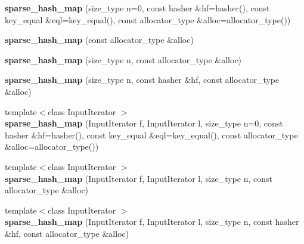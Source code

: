 \begin{DoxyCompactItemize}
\item 
{\bfseries sparse\+\_\+hash\+\_\+map} (size\+\_\+type n=0, const hasher \&hf=hasher(), const key\+\_\+equal \&eql=key\+\_\+equal(), const allocator\+\_\+type \&alloc=allocator\+\_\+type())\hypertarget{classspp___1_1sparse__hash__map_ae40db9ec7b6f4db0296504b523671af5}{}\label{classspp___1_1sparse__hash__map_ae40db9ec7b6f4db0296504b523671af5}

\item 
{\bfseries sparse\+\_\+hash\+\_\+map} (const allocator\+\_\+type \&alloc)\hypertarget{classspp___1_1sparse__hash__map_ac2a616ec8ea177f6c9a4e2570342671d}{}\label{classspp___1_1sparse__hash__map_ac2a616ec8ea177f6c9a4e2570342671d}

\item 
{\bfseries sparse\+\_\+hash\+\_\+map} (size\+\_\+type n, const allocator\+\_\+type \&alloc)\hypertarget{classspp___1_1sparse__hash__map_a2f3b25da203bb0e73ac4c863f38c6e92}{}\label{classspp___1_1sparse__hash__map_a2f3b25da203bb0e73ac4c863f38c6e92}

\item 
{\bfseries sparse\+\_\+hash\+\_\+map} (size\+\_\+type n, const hasher \&hf, const allocator\+\_\+type \&alloc)\hypertarget{classspp___1_1sparse__hash__map_ad34774d01a2332e4e95fd141e3c67d21}{}\label{classspp___1_1sparse__hash__map_ad34774d01a2332e4e95fd141e3c67d21}

\item 
{\footnotesize template$<$class Input\+Iterator $>$ }\\{\bfseries sparse\+\_\+hash\+\_\+map} (Input\+Iterator f, Input\+Iterator l, size\+\_\+type n=0, const hasher \&hf=hasher(), const key\+\_\+equal \&eql=key\+\_\+equal(), const allocator\+\_\+type \&alloc=allocator\+\_\+type())\hypertarget{classspp___1_1sparse__hash__map_aa3a95ee71b4aa3b814e9de97ac02671c}{}\label{classspp___1_1sparse__hash__map_aa3a95ee71b4aa3b814e9de97ac02671c}

\item 
{\footnotesize template$<$class Input\+Iterator $>$ }\\{\bfseries sparse\+\_\+hash\+\_\+map} (Input\+Iterator f, Input\+Iterator l, size\+\_\+type n, const allocator\+\_\+type \&alloc)\hypertarget{classspp___1_1sparse__hash__map_a3750bf282360359cdcef598b0c3a9151}{}\label{classspp___1_1sparse__hash__map_a3750bf282360359cdcef598b0c3a9151}

\item 
{\footnotesize template$<$class Input\+Iterator $>$ }\\{\bfseries sparse\+\_\+hash\+\_\+map} (Input\+Iterator f, Input\+Iterator l, size\+\_\+type n, const hasher \&hf, const allocator\+\_\+type \&alloc)\hypertarget{classspp___1_1sparse__hash__map_aedc8ff29807be9d548aa71201313805e}{}\label{classspp___1_1sparse__hash__map_aedc8ff29807be9d548aa71201313805e}


\end{DoxyCompactItemize}
